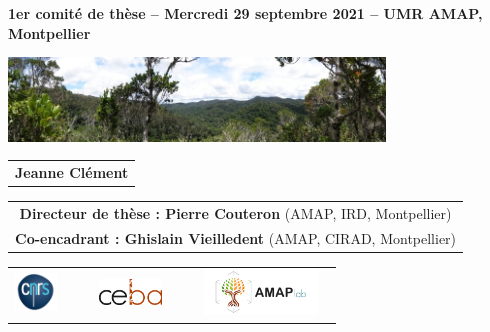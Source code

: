 {

  \begin{frame}
      \vspace{0.25cm}
    \footnotesize{\textbf{1er comité de thèse -- Mercredi 29 septembre 2021 -- UMR AMAP, Montpellier}}
    \vspace{0.2cm}
    \titlepage %
    \vspace{-2.5cm}
    \begin{center}
        \vspace{0.2cm}
      \includegraphics[width=10cm]{figs/Banniere.png}
    \end{center}
    \begin{center}
    \begin{tabular}{c}
      \small{\textbf{Jeanne Clément}}
    \end{tabular}
    \vspace{0.2cm}
   \begin{tabular}{c}
     \small{\textbf{Directeur de thèse : Pierre Couteron} (AMAP, IRD, Montpellier)} \\
     \small{\textbf{Co-encadrant : Ghislain Vieilledent} (AMAP, CIRAD, Montpellier)} 
    \end{tabular}

      \begin{tabular}{ccccccc}
        \includegraphics[height=1cm]{figs/logo_CNRS.png} & 
        & &
        \includegraphics[height=0.7cm]{figs/Logo_CEBA.jpg} &
        & &
        \includegraphics[height=1.2cm]{figs/AMAP.jpg} 
        ~
      \end{tabular}
      
\end{center}
\vspace{0.2cm}
\end{frame}
}
